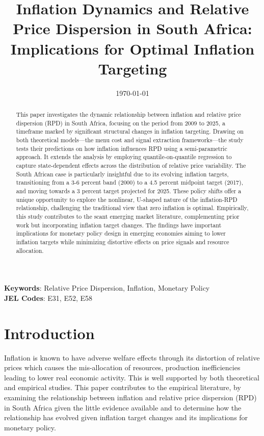 \documentclass[
  letterpaper,
  DIV=11,
  numbers=noendperiod]{scrartcl}
\author{}
\date{}
\begin{document}
\title{Inflation Dynamics and Relative Price Dispersion in South Africa: Implications for Optimal Inflation Targeting}



\date{\today}
\maketitle

\begin{abstract}
This paper investigates the dynamic relationship between inflation and relative price dispersion (RPD) in South Africa, focusing on the period from 2009 to 2025, a timeframe marked by significant structural changes in inflation targeting. Drawing on both theoretical models—the menu cost and signal extraction frameworks—the study tests their predictions on how inflation influences RPD using a semi-parametric approach. It extends the analysis by employing quantile-on-quantile regression to capture state-dependent effects across the distribution of relative price variability. The South African case is particularly insightful due to its evolving inflation targets, transitioning from a 3-6 percent band (2000) to a 4.5 percent midpoint target (2017), and moving towards a 3 percent target projected for 2025. These policy shifts offer a unique opportunity to explore the nonlinear, U-shaped nature of the inflation-RPD relationship, challenging the traditional view that zero inflation is optimal. Empirically, this study contributes to the scant emerging market literature, complementing prior work but incorporating inflation target changes. The findings have important implications for monetary policy design in emerging economies aiming to lower inflation targets while minimizing distortive effects on price signals and resource allocation.
\end{abstract}

\noindent\textbf{Keywords}: Relative Price Dispersion, Inflation, Monetary Policy\\
\textbf{JEL Codes}: E31, E52, E58
\newpage

\section{Introduction}\label{introduction}

Inflation is known to have adverse welfare effects through its
distortion of relative prices which causes the mis-allocation of
resources, production inefficiencies leading to lower real economic
activity. This is well supported by both theoretical and empirical
studies. This paper contributes to the empirical literature, by
examining the relationship between inflation and relative price
dispersion (RPD) in South Africa given the little evidence available and
to determine how the relationship has evolved given inflation target
changes and its implications for monetary policy.
\end{document}
